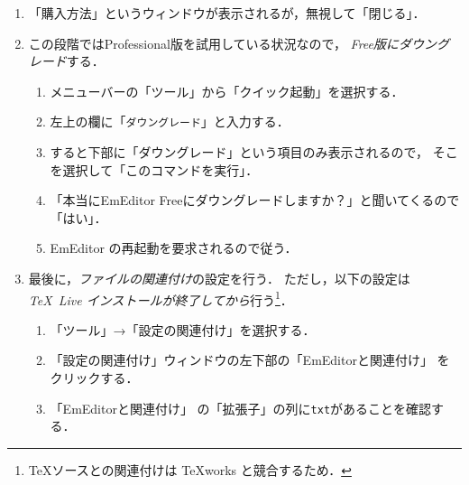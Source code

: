 \documentclass{ltjsarticle}
\begin{document}
\begin{enumerate}
\item 「購入方法」というウィンドウが表示されるが，無視して「閉じる」．
\item この段階ではProfessional版を試用している状況なので，
  \emph{Free版にダウングレード}する．

  \begin{enumerate}
  \item %
    メニューバーの「ツール」から「クイック起動」を選択する．
  \item 左上の欄に「\texttt{ダウングレード}」と入力する．
  \item すると下部に「ダウングレード」という項目のみ表示されるので，
    そこを選択して「このコマンドを実行」．
  \item 「本当にEmEditor Freeにダウングレードしますか？」と聞いてくるので「はい」．
  \item EmEditor の再起動を要求されるので従う．
  \end{enumerate}

\item 最後に，\emph{ファイルの関連付け}の設定を行う．
  ただし，以下の設定は \emph{\TeX~Live インストールが終了してから}行う\footnote{\TeX ソースとの関連付けは \TeX works と競合するため．}．
  \begin{enumerate}
  \item 「ツール」→「設定の関連付け」を選択する．%


  \item 「設定の関連付け」ウィンドウの左下部の「EmEditorと関連付け」
    をクリックする．%

  \item 「EmEditorと関連付け」%
    の「拡張子」の列に\texttt{txt}があることを確認する．


\end{enumerate}
\end{enumerate}
\end{document}

